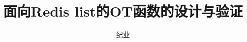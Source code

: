 \documentclass[bachelor,oneside,winfonts]{njuthesis}
\title{面向Redis list的OT函数的设计与验证}
\author{纪业}
\institute{南京大学}
\begin{document}
	
	\maketitle
	\makeenglishtitle
	
	\frontmatter
	
	
	
	\tableofcontents
	
	\mainmatter
	
	
	
	
	
	
	
	
	
\end{document}

